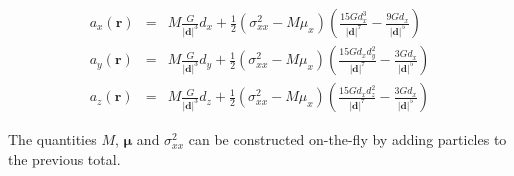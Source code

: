 \documentclass[a4paper,10pt]{article}
\newcommand{\rr}{\mathbf{r}}
\newcommand{\dd}{\mathbf{d}}
\newcommand{\p}[1]{\mathbf{p}_#1}
\newcommand{\muu}{\boldsymbol{\mu}}
\begin{document}
\begin{eqnarray}
 a_x(\rr) &=& M\frac{G}{|\dd|^3} d_x + \frac{1}{2}\left(\sigma_{xx}^2 - M\mu_x\right)\left(\frac{15Gd_x^3}{|\dd|^7} - 
\frac{9Gd_x}{|\dd|^5}\right)\\
 a_y(\rr) &=& M\frac{G}{|\dd|^3} d_y + \frac{1}{2}\left(\sigma_{xx}^2 - M\mu_x\right)\left(\frac{15Gd_xd_y^2}{|\dd|^7}- 
\frac{3Gd_x}{|\dd|^5}\right) \\
 a_z(\rr) &=& M\frac{G}{|\dd|^3} d_z + \frac{1}{2}\left(\sigma_{xx}^2 - M\mu_x\right)\left(\frac{15Gd_xd_z^2}{|\dd|^7}- 
\frac{3Gd_x}{|\dd|^5}\right)
\end{eqnarray}

The quantities $M$, $\muu$ and $\sigma_{xx}^2$ can be constructed on-the-fly by adding particles to the previous total.

% 
% 
% 
% 
% 
% 
% 
% 
% 
\end{document}
